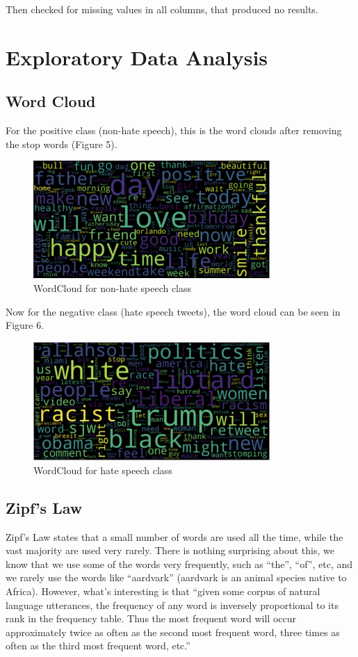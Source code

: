 \documentclass{article}
\begin{document}
	Then checked for missing values in all columns, that produced no results. 
	
	\section{Exploratory Data Analysis}
	
	\subsection{Word Cloud}
	
	For the positive class (non-hate speech), this is the word clouds after removing the stop words (Figure 5).
	
	\begin{figure}[h]
		\label{Figure 5}
		\caption{WordCloud for non-hate speech class}
		\includegraphics[width=9cm]{wordpos.png}
		\centering
	\end{figure}
	
	Now for the negative class (hate speech tweets), the word cloud can be seen in Figure 6.
	
	\begin{figure}[h]
		\label{Figure 6}
		\caption{WordCloud for hate speech class}
		\includegraphics[width=9cm]{wordneg.png}
		\centering
	\end{figure}
	
	\subsection{Zipf's Law}
	
	Zipf’s Law states that a small number of words are used all the time, while the vast majority are used very rarely. There is nothing surprising about this, we know that we use some of the words very frequently, such as “the”, “of”, etc, and we rarely use the words like “aardvark” (aardvark is an animal species native to Africa). However, what’s interesting is that “given some corpus of natural language utterances, the frequency of any word is inversely proportional to its rank in the frequency table. Thus the most frequent word will occur approximately twice as often as the second most frequent word, three times as often as the third most frequent word, etc.”
	
\end{document}
